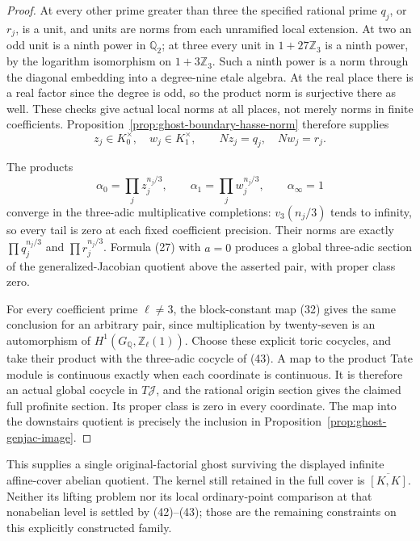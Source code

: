 \begin{proof}
At every other prime greater than three the
specified rational prime \(q_j\), or \(r_j\),
is a unit, and units are norms from each
unramified local extension. At two an odd unit
is a ninth power in \(\mathbb Q_2\); at three
every unit in \(1+27\mathbb Z_3\) is a ninth
power, by the logarithm isomorphism on
\(1+3\mathbb Z_3\). Such a ninth power is a
norm through the diagonal embedding into a
degree-nine etale algebra. At the real place
there is a real factor since the degree is odd,
so the product norm is surjective there as well.
These checks give actual local norms at all
places, not merely norms in finite coefficients.
Proposition~\ref{prop:ghost-boundary-hasse-norm}
therefore supplies
\[
 z_j\in K_0^\times,\quad w_j\in K_1^\times,
              \qquad Nz_j=q_j,\quad Nw_j=r_j.       \tag{42}
\]

The products
\[
 \alpha_0=\prod_j z_j^{n_j/3},\qquad
 \alpha_1=\prod_j w_j^{n_j/3},\qquad
                    \alpha_\infty=1                 \tag{43}
\]
converge in the three-adic multiplicative completions:
\(v_3(n_j/3)\) tends to infinity, so every tail
is zero at each fixed coefficient precision.
Their norms are exactly
\(\prod q_j^{n_j/3}\) and \(\prod r_j^{n_j/3}\).
Formula (27) with \(a=0\) produces a global
three-adic section of the generalized-Jacobian
quotient above the asserted pair, with proper
class zero.

For every coefficient prime \(\ell\ne3\), the
block-constant map (32) gives the same conclusion
for an arbitrary pair, since multiplication by
twenty-seven is an automorphism of
\(H^1(G_{\mathbb Q},\mathbb Z_\ell(1))\).
Choose these explicit toric cocycles, and take
their product with the three-adic cocycle of
(43). A map to the product Tate module is
continuous exactly when each coordinate is
continuous. It is therefore an actual global
cocycle in \(T\mathcal J\), and the rational
origin section gives the claimed full profinite
section. Its proper class is zero in every
coordinate. The map into the downstairs quotient
is precisely the inclusion in
Proposition~\ref{prop:ghost-genjac-image}.
\end{proof}

This supplies a single original-factorial ghost
surviving the displayed infinite affine-cover
abelian quotient. The kernel still retained in
the full cover is \(\overline{[K,K]}\). Neither
its lifting problem nor its local ordinary-point
comparison at that nonabelian level is settled by
(42)--(43); those are the remaining constraints
on this explicitly constructed family.
